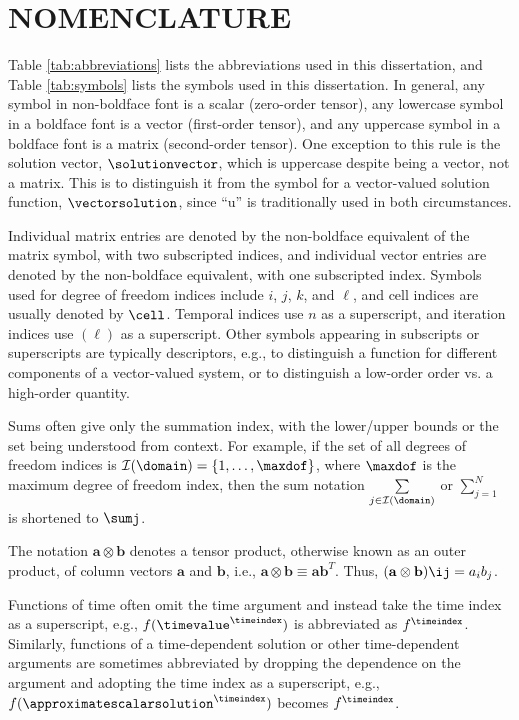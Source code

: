 \chapter*{NOMENCLATURE}

Table \ref{tab:abbreviations} lists the abbreviations used in this dissertation,
and Table \ref{tab:symbols} lists the symbols used in this dissertation.
In general, any symbol in non-boldface font is a scalar (zero-order tensor),
any lowercase symbol in a boldface font is a vector (first-order tensor),
and any uppercase symbol in a boldface font is a matrix (second-order tensor).
One exception to this rule is the solution vector, $\solutionvector$, which
is uppercase despite being a vector, not a matrix. This is to distinguish
it from the symbol for a vector-valued solution function,
$\vectorsolution$, since ``u'' is traditionally used in both circumstances.

Individual matrix entries are denoted by the non-boldface equivalent of
the matrix symbol, with two subscripted indices, and individual vector entries
are denoted by the non-boldface equivalent, with one subscripted index.
Symbols used for degree of freedom indices include $i$, $j$, $k$, and $\ell$,
and cell indices are usually denoted by $\cell$.
Temporal indices
use $n$ as a superscript, and iteration indices use $(\ell)$
as a superscript. Other symbols appearing in subscripts or superscripts
are typically descriptors, e.g., to distinguish a function for different
components of a vector-valued system, or to distinguish a low-order order
vs. a high-order quantity.

Sums often give only the summation index, with the lower/upper bounds or the
set being understood from context. For example, if the set of all degrees of freedom indices
is $\mathcal{I}(\domain)=\{1,\ldots,\maxdof\}$, where $\maxdof$ is the maximum
degree of freedom index, then the sum notation
$\sum\limits_{j\in\mathcal{I}(\domain)}$ or $\sum\limits_{j=1}^N$ is shortened
to $\sumj$.

The notation $\mathbf{a}\otimes\mathbf{b}$ denotes a tensor product, otherwise
known as an outer product, of column vectors $\mathbf{a}$ and $\mathbf{b}$,
i.e., $\mathbf{a}\otimes\mathbf{b}\equiv\mathbf{a}\mathbf{b}^T$. Thus,
$(\mathbf{a}\otimes\mathbf{b})\ij = a_i b_j$.

Functions of time often omit the time argument and instead take the time index
as a superscript, e.g., $f(\timevalue^\timeindex)$ is abbreviated as
$f^\timeindex$. Similarly, functions of a time-dependent solution or other
time-dependent arguments are sometimes abbreviated by dropping the dependence
on the argument and adopting the time index as a superscript, e.g.,
$f(\approximatescalarsolution^\timeindex)$ becomes $f^\timeindex$.



